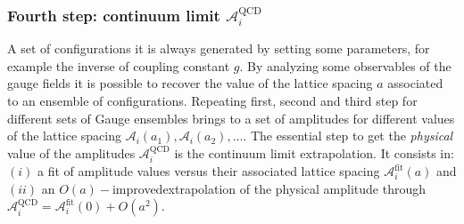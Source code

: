 \documentclass[english, LaM, oneside, noexaminfo]{sapthesis}
\newcommand{\oaid}{$O(a)-$improved}
\begin{document}
\subsubsection*{Fourth step: continuum limit $\mathcal{A}_i^\text{QCD}$}
\noindent
A set of configurations it is always generated by setting some parameters, for example the inverse of coupling constant $g$.
By analyzing some observables of the gauge fields it is possible to recover the value of the lattice spacing $a$ associated to an ensemble of configurations.
\newline
Repeating first, second and third step for different sets of Gauge ensembles brings to a set of amplitudes for different values of the lattice spacing $\mathcal{A}_i (a_1), \mathcal{A}_i (a_2), \dots$.
The essential step to get the {\it physical} value of the amplitudes $\mathcal{A}_i^\text{QCD}$ is the continuum limit extrapolation.
It consists in:
$(i)$ a fit of amplitude values versus their associated lattice spacing $\mathcal{A}_i^\text{fit} (a) $ and
$(ii)$ an \oaid\space extrapolation of the physical amplitude through $ \mathcal{A}_i^\text{QCD} = \mathcal{A}_i^\text{fit} (0) + O(a^2)$.
\end{document}
